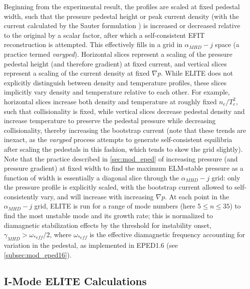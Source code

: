 Beginning from the experimental result, the profiles are scaled at fixed pedestal width, such that the pressure pedestal height or peak current density (with the current calculated by the Sauter formulation \cite{Sauter1999}) is increased or decreased relative to the original by a scalar factor, after which a self-consistent EFIT reconstruction is attempted.  This effectively fills in a grid in $\alpha_{MHD} - j$ space (a practice termed \emph{varyped}).  Horizontal slices represent a scaling of the pressure pedestal height (and therefore gradient) at fixed current, and vertical slices represent a scaling of the current density at fixed $\nabla p$.  While ELITE does not explicitly distinguish between density and temperature profiles, these slices implicitly vary density and temperature relative to each other.  For example, horizontal slices increase both density and temperature at roughly fixed $n_e/T_e^2$, such that collisionality is fixed, while vertical slices decrease pedestal density and increase temperature to preserve the pedestal pressure while decreasing collisionality, thereby increasing the bootstrap current (note that these trends are inexact, as the \emph{varyped} process attempts to generate self-consistent equilibria after scaling the pedestals in this fashion, which tends to skew the grid slightly).  Note that the practice described in \cref{sec:mod_eped} of increasing pressure (and pressure gradient) at fixed width to find the maximum ELM-stable pressure as a function of width is essentially a diagonal slice through the $\alpha_{MHD} - j$ grid: only the pressure profile is explicitly scaled, with the bootstrap current allowed to self-consistently vary, and will increase with increasing $\nabla p$.  At each point in the $\alpha_{MHD} - j$ grid, ELITE is run for a range of mode numbers (here $5 \le n \le 35$) to find the most unstable mode and its growth rate; this is normalized to diamagnetic stabilization effects by the threshold for instability onset, $\gamma_{MHD} > \omega_{*eff}/2$, where $\omega_{*eff}$ is the effective diamagnetic frequency accounting for variation in the pedestal, as implemented in EPED1.6 (see \cref{subsec:mod_eped16}).

\subsection{I-Mode ELITE Calculations}\label{subsec:imode_elite_calc}


